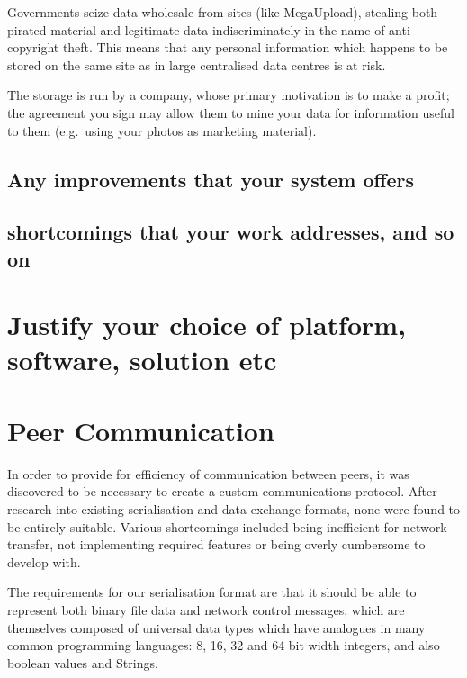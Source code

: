 \documentclass[12pt,a4paper,]{adreport}
\begin{document}
Governments seize data wholesale from sites (like MegaUpload), stealing
both pirated material and legitimate data indiscriminately in the name
of anti-copyright theft. This means that any personal information which
happens to be stored on the same site as in large centralised data
centres is at risk.

The storage is run by a company, whose primary motivation is to make a
profit; the agreement you sign may allow them to mine your data for
information useful to them (e.g.~using your photos as marketing
material).

\subsection{Any improvements that your system
offers}\label{any-improvements-that-your-system-offers}

\subsection{shortcomings that your work addresses, and so
on}\label{shortcomings-that-your-work-addresses-and-so-on}

\section{Justify your choice of platform, software, solution
etc}\label{justify-your-choice-of-platform-software-solution-etc}

\section{Peer Communication}\label{peer-communication}

In order to provide for efficiency of communication between peers, it
was discovered to be necessary to create a custom communications
protocol. After research into existing serialisation and data exchange
formats, none were found to be entirely suitable. Various shortcomings
included being inefficient for network transfer, not implementing
required features or being overly cumbersome to develop with.

The requirements for our serialisation format are that it should be able
to represent both binary file data and network control messages, which
are themselves composed of universal data types which have analogues in
many common programming languages: 8, 16, 32 and 64 bit width integers,
and also boolean values and Strings.
\end{document}
